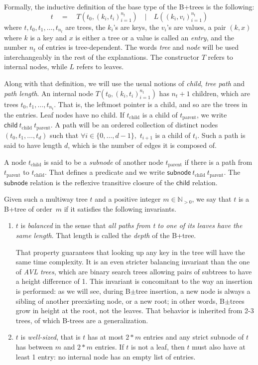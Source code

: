 \documentclass[11pt]{article}
\begin{document}
{Formally, the inductive definition of the base type of the B+trees is the following:
\[ t \quad = \quad T(t_0, (k_i, t_i)_{i = 1}^{n_t})\quad | \quad L((k_i, v_i)_{i = 1}^{n_t}) \]
where $t, t_0, t_1, \dots, t_{n_t}$ are trees, the $k_i$'s are keys, the $v_i$'s are values, a pair $(k, x)$ where $k$ is a key and $x$ is either a tree or a value is called an \emph{entry}, and the number $n_t$ of entries is tree-dependent.
The words \emph{tree} and \emph{node} will be used interchangeably in the rest of the explanations. The constructor $T$ refers to internal nodes, while $L$ refers to leaves.

Along with that definition, we will use the usual notions of \emph{child}, \emph{tree path} and \emph{path length}.
An internal node $T(t_0, (k_i, t_i)_{i = 1}^{n_t})$ has $n_t + 1$ children, which are trees $t_0, t_1, \dots, t_{n_t}$. That is, the leftmost pointer is a child, and so are the trees in the entries.
Leaf nodes have no child. If $t_\text{child}$ is a child of $t_\text{parent}$, we write $\mathsf{child}\ t_\text{child}\ t_\text{parent}$.
A path will be an ordered collection of distinct nodes $(t_0, t_1, \dots, t_d)$ such that $\forall i \in \{0, \dots, d - 1\},$ $t_{i + 1}$ is a child of $t_i$.
Such a path is said to have length $d$, which is the number of edges it is composed of.

A node $t_\text{child}$ is said to be a \emph{subnode} of another node $t_\text{parent}$ if there is a path from $t_\text{parent}$ to $t_\text{child}$.
That defines a predicate and we write $\mathsf{subnode}\ t_\text{child}\ t_\text{parent}$.
The $\mathsf{subnode}$ relation is the reflexive transitive closure of the $\mathsf{child}$ relation.

Given such a multiway tree $t$ and a positive integer $m \in \mathbb{N}_{>0}$, we say that $t$ is a B+tree of order~$m$ if it satisfies the following invariants.
\begin{enumerate}
  \itemsep0em
  \item $t$ is \emph{balanced} in the sense that \emph{all paths from t to one of its leaves have the same length}. That length is called the \emph{depth} of the B+tree.

    That property guarantees that looking up any key in the tree will have the same time complexity.
    It is an even stricter balancing invariant than the one of \emph{AVL trees}, which are binary search trees allowing pairs of subtrees to have a height difference of 1.
    This invariant is concomitant to the way an insertion is performed:
    as we will see, during B$\pm$tree insertion, a new node is always a sibling of another preexisting node, or a new root; in other words, B$\pm$trees grow in height at the root, not the leaves.
    That behavior is inherited from 2-3 trees, of which B-trees are a generalization.
  \item $t$ is \emph{well-sized}, that is $t$ has at most $2 * m$ entries and any strict subnode of $t$ has between $m$ and $2 * m$ entries.
    If $t$ is not a leaf, then $t$ must also have at least 1 entry: no internal node has an empty list of entries.


\end{enumerate}}
\end{document}
